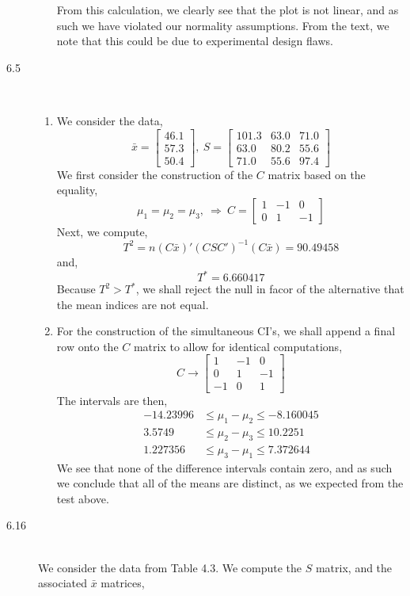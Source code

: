 \documentclass[letterpaper,10pt]{article}
\begin{document}
\begin{description}
\begin{enumerate}[label=\alph*.]
\begin{center}
\end{center}
From this calculation, we clearly see that the plot is not linear, and as such we have violated our normality assumptions. From the text, we note that this could be due to experimental design flaws.
\end{enumerate}
\item[6.5]\hfill \\
\begin{enumerate}[label=\alph*.]
\item We consider the data,
\[\bar{x}=\begin{bmatrix}
46.1\\57.3\\50.4
\end{bmatrix},\ S=\begin{bmatrix}
101.3 & 63.0 & 71.0\\
63.0 & 80.2 & 55.6\\
71.0 & 55.6 & 97.4
\end{bmatrix} \]
We first consider the construction of the $C$ matrix based on the equality,
\[\mu_1=\mu_2=\mu_3,\ \Rightarrow\ C=\begin{bmatrix}
1 & -1 & 0\\
0 & 1 & -1
\end{bmatrix} \]
Next, we compute,
\[T^2=n(C\bar{x})'(CSC')^{-1}(C\bar{x})=90.49458\]
and,
\[T^*=6.660417\]
Because $T^2>T^*$, we shall reject the null in facor of the alternative that the mean indices are not equal. 
\item For the construction of the simultaneous CI's, we shall append a final row onto the $C$ matrix to allow for identical computations,
\[C\to \begin{bmatrix}
1 & -1 & 0\\
0 & 1 & -1\\
-1 & 0 & 1
\end{bmatrix}\]
The intervals are then,
\begin{align*}
-14.23996 & \leq \mu_1-\mu_2 \leq -8.160045\\
3.5749 & \leq \mu_2-\mu_3 \leq 10.2251\\
1.227356 & \leq \mu_3-\mu_1 \leq 7.372644
\end{align*}
We see that none of the difference intervals contain zero, and as such we conclude that all of the means are distinct, as we expected from the test above.
\end{enumerate}
\item[6.16]\hfill \\
We consider the data from Table 4.3. We compute the $S$ matrix, and the associated $\bar{x}$ matrices,

\end{description}
\end{document}
